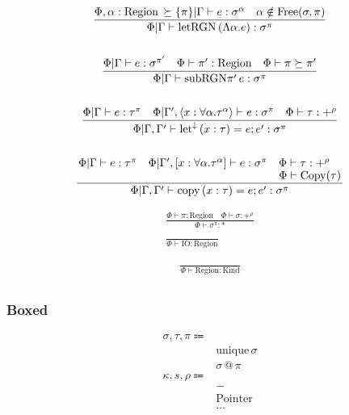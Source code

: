\documentclass {article}
\begin{document}
\begin{gather*}
\frac
{\Phi , \alpha : \text{Region} \, \succeq \{ \pi \} | \Gamma \vdash e : \sigma^\alpha \quad \alpha \notin \text{Free}(\sigma, \pi)}
{\Phi | \Gamma \vdash \text{letRGN} \, (\Lambda \alpha. e) : \sigma^\pi} \\
\\
\frac
{\Phi | \Gamma \vdash e : \sigma^{\pi'} \quad \Phi \vdash \pi' : \text{Region} \quad \Phi \vdash \pi \succeq \pi' }
{\Phi | \Gamma \vdash \text{subRGN} \pi' \, e : \sigma^{\pi} } \\
\\
\frac
{\Phi | \Gamma \vdash e : \tau^\pi \quad \Phi | \Gamma', \langle x : \forall \alpha. \tau^\alpha \rangle \vdash e : \sigma^\pi \quad \Phi \vdash \tau : +^{\rho}}
{\Phi | \Gamma, \Gamma' \vdash \text{let}^\downarrow \, (x : \tau) = e; e' : \sigma^\pi} \\
\\
\frac
{\splitfrac{\Phi | \Gamma \vdash e : \tau^\pi \quad \Phi | \Gamma', [ x : \forall \alpha. \tau^\alpha ] \vdash e : \sigma^\pi \quad \Phi \vdash \tau : +^{\rho}}
{\Phi \vdash \text{Copy}(\tau)}}
{\Phi | \Gamma, \Gamma' \vdash \text{copy} \, (x : \tau) = e; e' : \sigma^\pi} \\
\end{gather*}

\begin{gather*}
\frac
{\Phi \vdash \pi : \text{Region} \quad \Phi \vdash \sigma : +^\rho}
{\Phi \vdash \sigma^\pi : *} \\
\\
\frac
{}
{\Phi \vdash \text{IO} : \text{Region}}
\end{gather*}

\begin{gather*}
\frac
{}
{\Phi \vdash \text{Region} : \text{Kind}} \\
\end{gather*}

\subsubsection{Boxed}
\begin{align*}
\sigma, \tau, \pi \Coloneqq & \\
& \text{unique} \, \sigma \\
& \sigma \, @ \, \pi \\
\kappa, s, \rho \Coloneqq & \\
& - \tag{Boxed} \\
& \text{Pointer} \tag{Pointer Representation} \\
& \dots \\
\end{align*}
\end{document}
